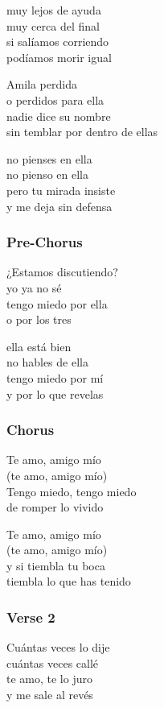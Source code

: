 muy lejos de ayuda\\
muy cerca del final\\
si salíamos corriendo\\
podíamos morir igual

Amila perdida\\
o perdidos para ella\\
nadie dice su nombre\\
sin temblar por dentro de ellas

no pienses en ella\\
no pienso en ella\\
pero tu mirada insiste\\
y me deja sin defensa

\subsubsection{Pre-Chorus}\label{pre-chorus-20}

¿Estamos discutiendo?\\
yo ya no sé\\
tengo miedo por ella\\
o por los tres

ella está bien\\
no hables de ella\\
tengo miedo por mí\\
y por lo que revelas

\subsubsection{Chorus}\label{chorus-42}

Te amo, amigo mío\\
(te amo, amigo mío)\\
Tengo miedo, tengo miedo\\
de romper lo vivido

Te amo, amigo mío\\
(te amo, amigo mío)\\
y si tiembla tu boca\\
tiembla lo que has tenido

\subsubsection{Verse 2}\label{verse-2-19}

Cuántas veces lo dije\\
cuántas veces callé\\
te amo, te lo juro\\
y me sale al revés

